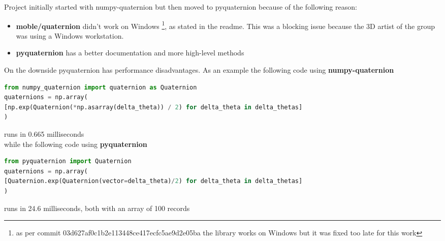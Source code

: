 Project initially started with numpy-quaternion \cite{numpy-quaternion} but then moved to pyquaternion \cite{pyquaternion} because of the following reason:
\begin{itemize}
\item \textbf{moble/quaternion} didn't work on Windows \footnote{ as per commit 03d627af0c1b2e113448ce417ecfc5ae9d2e05ba the library works on Windows but it was fixed too late for this work}, as stated in the readme. This was a blocking issue because the 3D artist of the group was using a Windows workstation.
\item \textbf{pyquaternion} has a better documentation and more high-level methods
\end{itemize}

On the downside pyquaternion has performance disadvantages. As an example the following code using \textbf{numpy-quaternion}
\begin{changemargin}{-1cm}{-1cm}
\begin{lstlisting}[language=Python,frame=single]
from numpy_quaternion import quaternion as Quaternion
quaternions = np.array(
[np.exp(Quaternion(*np.asarray(delta_theta)) / 2) for delta_theta in delta_thetas]
)
\end{lstlisting}
\end{changemargin}
runs in 0.665 milliseconds \\
while the following code using \textbf{pyquaternion} 
\begin{changemargin}{-1cm}{-1cm}
\begin{lstlisting}[language=Python,frame=single]
from pyquaternion import Quaternion
quaternions = np.array(
[Quaternion.exp(Quaternion(vector=delta_theta)/2) for delta_theta in delta_thetas]
)
\end{lstlisting}
\end{changemargin}
runs in 24.6 milliseconds, both with an array of 100 records